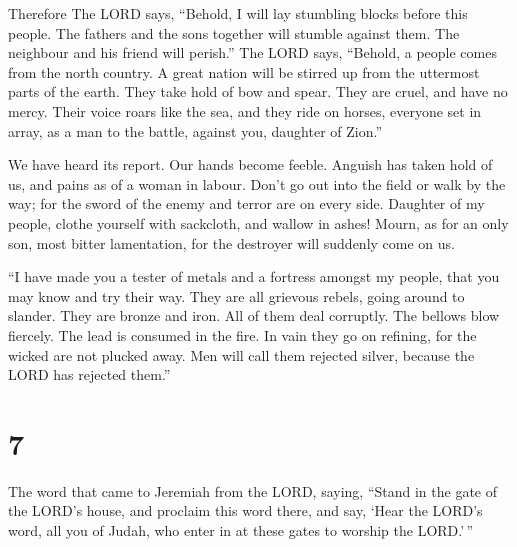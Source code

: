  Therefore The LORD says, ``Behold, I will lay stumbling
blocks before this people. The fathers and the sons together will
stumble against them. The neighbour and his friend will perish.''
 The LORD says, ``Behold, a people comes from the north
country. A great nation will be stirred up from the uttermost parts of
the earth.  They take hold of bow and spear. They are
cruel, and have no mercy. Their voice roars like the sea, and they ride
on horses, everyone set in array, as a man to the battle, against you,
daughter of Zion.''

 We have heard its report. Our hands become feeble. Anguish
has taken hold of us, and pains as of a woman in labour. 
Don't go out into the field or walk by the way; for the sword of the
enemy and terror are on every side.  Daughter of my people,
clothe yourself with sackcloth, and wallow in ashes! Mourn, as for an
only son, most bitter lamentation, for the destroyer will suddenly come
on us.

 ``I have made you a tester of metals and a fortress
amongst my people, that you may know and try their way. 
They are all grievous rebels, going around to slander. They are bronze
and iron. All of them deal corruptly.  The bellows blow
fiercely. The lead is consumed in the fire. In vain they go on refining,
for the wicked are not plucked away.  Men will call them
rejected silver, because the LORD has rejected them.''

\hypertarget{section-6}{%
\section{7}\label{section-6}}

 The word that came to Jeremiah from the LORD, saying,
 ``Stand in the gate of the LORD's house, and proclaim this
word there, and say, `Hear the LORD's word, all you of Judah, who enter
in at these gates to worship the LORD.'\,''

